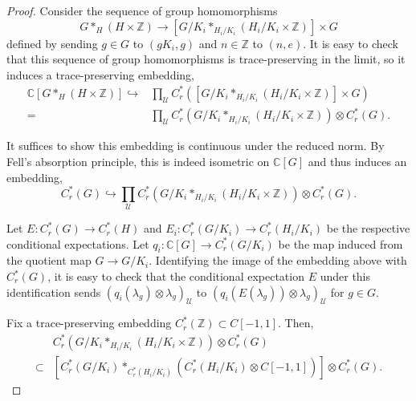 \documentclass[10pt]{amsart}
\theoremstyle{definition}
\newcommand{\C}{\ensuremath{\mathbb{C}}}
\newcommand{\Z}{\ensuremath{\mathbb{Z}}}
\newcommand{\cU}{\ensuremath{\mathcal{U}}}
\begin{document}
\begin{proof}
    Consider the sequence of group homomorphisms
    \begin{equation*}
        G \ast_H (H \times \Z) \to [G/K_i \ast_{H_i/K_i} (H_i/K_i \times \Z)] \times G
    \end{equation*}
    defined by sending $g\in G$ to $(gK_i, g)$ and $n\in \Z$ to $(n,e)$. It is easy to check that this sequence of group homomorphisms is trace-preserving in the limit, so it induces a trace-preserving embedding,
    \begin{equation}\label{eqn: group alg map}
    \begin{split}
        \C[G \ast_H (H \times \Z)] \hookrightarrow &\prod_\cU C_r^\ast([G/K_i \ast_{H_i/K_i} (H_i/K_i \times \Z)] \times G)\\
        = &\prod_\cU C_r^\ast(G/K_i \ast_{H_i/K_i} (H_i/K_i \times \Z)) \otimes C_r^\ast(G).
    \end{split}
    \end{equation}

    It suffices to show this embedding is continuous under the reduced norm. By Fell's absorption principle, this is indeed isometric on $\C[G]$ and thus induces an embedding,
    \begin{equation}\label{eqn: embedding}
        C_r^\ast(G) \hookrightarrow \prod_\cU C_r^\ast(G/K_i \ast_{H_i/K_i} (H_i/K_i\times\Z)) \otimes C_r^\ast(G).
    \end{equation}

    Let $E:C_r^\ast(G) \to C_r^\ast(H)$ and $E_i: C_r^\ast(G/K_i) \to C_r^\ast(H_i/K_i)$ be the respective conditional expectations. Let $q_i: \C[G] \to C_r^\ast(G/K_i)$ be the map induced from the quotient map $G \to G/K_i$. Identifying the image of the embedding above with $C_r^\ast(G)$, it is easy to check that the conditional expectation $E$ under this identification sends $(q_i(\lambda_g) \otimes \lambda_g)_\cU$ to $(q_i(E(\lambda_g)) \otimes \lambda_g)_\cU$ for $g \in G$.

    Fix a trace-preserving embedding $C_r^\ast(\Z) \subset C[-1, 1]$. Then,
    \begin{equation}\label{eqn: group embedding}
    \begin{split}
        &C_r^\ast(G/K_i \ast_{H_i/K_i} (H_i/K_i\times\Z)) \otimes C_r^\ast(G)\\
        \subset &[C_r^\ast(G/K_i) \ast_{C_r^\ast(H_i/K_i)} (C_r^\ast(H_i/K_i) \otimes C[-1,1])] \otimes C_r^\ast(G).
    \end{split}
    \end{equation}


\end{proof}
\end{document}
